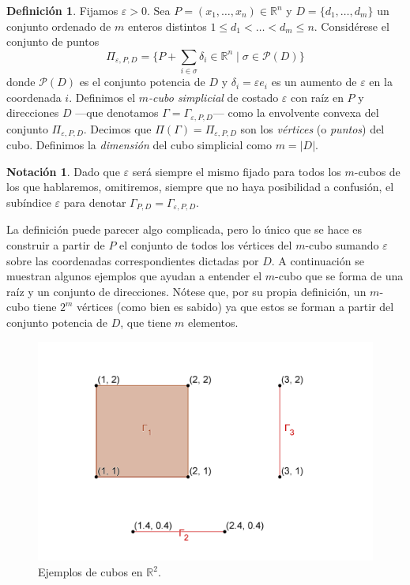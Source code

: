 \documentclass[12pt,a4paper,twoside]{article} %
\theoremstyle{plain}
\theoremstyle{definition}
\newtheorem{definicion}{Definición}[subsection]
\newtheorem*{notacion}{Notación}
\newcommand{\R}{\mathbb{R}}
\newcommand{\tq}{\; | \;}
\begin{document}
\begin{definicion}
Fijamos $\varepsilon > 0$. Sea $P=(x_1,\dots,x_n)\in\R^n$ y $D=\{d_1,\dots,d_m\}$ un conjunto ordenado de $m$ enteros distintos $1\leq d_1 < \dots <d_m \leq n$. Considérese el conjunto de puntos
$$ \Pi_{\varepsilon,P,D} = \lbrace P + \sum_{i\in\sigma} \delta_i  \in \R^n  \tq \sigma \in \mathcal{P}(D) \rbrace $$
donde $\mathcal{P}(D)$ es el conjunto potencia de $D$ y $\delta_i = \varepsilon e_i$ es un aumento de $\varepsilon$ en la coordenada $i$. Definimos el \emph{$m$-cubo simplicial} de costado $\varepsilon$ con raíz en $P$ y direcciones $D$ ---que denotamos $\Gamma = \Gamma_{\varepsilon,P,D}$--- como la envolvente convexa del conjunto $\Pi_{\varepsilon,P,D}$. Decimos que $\Pi(\Gamma) = \Pi_{\varepsilon,P,D}$ son los \emph{vértices} (o \emph{puntos}) del cubo. Definimos la \emph{dimensión} del cubo simplicial como $m=\vert D\vert$.
\end{definicion}

\begin{notacion}
Dado que $\varepsilon$ será siempre el mismo fijado para todos los $m$-cubos de los que hablaremos, omitiremos, siempre que no haya posibilidad a confusión, el subíndice $\varepsilon$ para denotar $\Gamma_{P,D} = \Gamma_{\varepsilon,P,D}$.
\end{notacion}

La definición puede parecer algo complicada, pero lo único que se hace es construir a partir de $P$ el conjunto de todos los vértices del $m$-cubo sumando $\varepsilon$ sobre las coordenadas correspondientes dictadas por $D$. A continuación se muestran algunos ejemplos que ayudan a entender el $m$-cubo que se forma de una raíz y un conjunto de direcciones. Nótese que, por su propia definición, un $m$-cubo tiene $2^m$ vértices (como bien es sabido) ya que estos se forman a partir del conjunto potencia de $D$, que tiene $m$ elementos.

\begin{figure}[h]
\centering
\includegraphics[scale=0.6]{img/cubos.png}
\caption{Ejemplos de cubos en $\R^2$.}
\label{cubos}
\end{figure}
\end{document}
